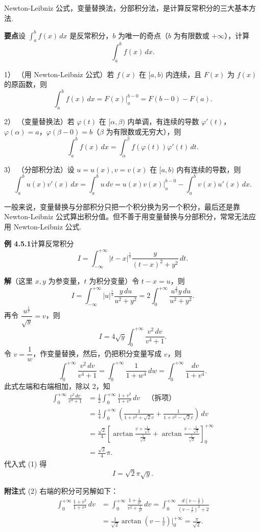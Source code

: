 \documentclass[UTF8,12pt,a4paper,fontset=fandol]{ctexart}
\begin{document}
Newton-Leibniz 公式，变量替换法，分部积分法，是计算反常积分的三大基本方法.

\noindent\textbf{要点}\quad 设 $\displaystyle\int_a^b f(x)\,dx$ 是反常积分，$b$ 为唯一的奇点（$b$ 为有限数或 $+\infty$），计算
\[
\int_a^b f(x)\,dx.
\]

1） （用 Newton-Leibniz 公式）若 $f(x)$ 在 $[a,b)$ 内连续，且 $F(x)$ 为 $f(x)$ 的原函数，则
\[
\int_a^b f(x)\,dx
=F(x)\Big|_a^{b-0}=F(b-0)-F(a).
\]

2） （变量替换法）若 $\varphi(t)$ 在 $[\alpha,\beta)$ 内单调，有连续的导数 $\varphi'(t)$，$\varphi(\alpha)=a$，$\varphi(\beta-0)=b$（$\beta$ 为有限数或无穷大），则
\[
\int_a^b f(x)\,dx
=\int_\alpha^\beta f(\varphi(t))\varphi'(t)\,dt.
\]

3） （分部积分法）设 $u=u(x),v=v(x)$ 在 $[a,b)$ 内有连续的导数，则
\[
\int_a^b u(x)v'(x)\,dx
=\int_a^b u\,dv
=u(x)v(x)\Big|_a^{b-0}-\int_a^b v(x)u'(x)\,dx.
\]

一般来说，变量替换与分部积分只把一个积分换为另一个积分，最后还是靠 Newton-Leibniz 公式算出积分值。但不善于用变量替换与分部积分，常常无法应用 Newton-Leibniz 公式.

\noindent\textbf{例 4.5.1}\quad 计算反常积分
\[
I=\int_{-\infty}^{+\infty}|t-x|^{\frac12}
\frac{y}{(t-x)^2+y^2}\,dt.
\]

\noindent\textbf{解}\quad （这里 $x,y$ 为参变量，$t$ 为积分变量）令 $t-x=u$，则
\[
I=\int_{-\infty}^{+\infty}|u|^{\frac12}\frac{y\,du}{u^2+y^2}
=2\int_0^{+\infty}\frac{u^{\frac12}y\,du}{u^2+y^2}.
\]
再令 $\dfrac{u^{\frac12}}{\sqrt y}=v$，则
\[
I=4\sqrt y\int_0^{+\infty}\frac{v^2\,dv}{v^4+1}. \tag{1}
\]
令 $v=\dfrac1w$，作变量替换，然后，仍把积分变量写成 $v$，则
\[
\int_0^{+\infty}\frac{v^2\,dv}{v^4+1}
=\int_0^{+\infty}\frac1{1+w^4}\,dw
=\int_0^{+\infty}\frac{dv}{1+v^4}.
\]
此式左端和右端相加，除以 2，知
\[
\begin{aligned}
\int_0^{+\infty}\frac{v^2\,dv}{v^4+1}
&=\frac12\int_0^{+\infty}\frac{1+v^2}{1+v^4}\,dv \quad\text{（拆项）}\\
&=\frac14\int_0^{+\infty}
\left(\frac1{1+v^2+\sqrt2v}+\frac1{1+v^2-\sqrt2v}\right)\,dv\\
&=\frac{\sqrt2}{4}\left[
\arctan\frac{v+\frac1{\sqrt2}}{\frac1{\sqrt2}}
+\arctan\frac{v-\frac1{\sqrt2}}{\frac1{\sqrt2}}
\right]_0^{+\infty}\\
&=\frac{\sqrt2}{4}\pi.
\end{aligned}
\]
代入式 (1) 得
\[
I=\sqrt2\pi\sqrt y.
\]

\noindent\textbf{附注}\quad 式 (2) 右端的积分可另解如下：
\[
\begin{aligned}
\int_0^{+\infty}\frac{1+v^2}{1+v^4}\,dv
&=\int_0^{+\infty}\frac{1+\frac1{v^2}}{v^2+\frac1{v^2}}\,dv
=\int_0^{+\infty}\frac{d\left(v-\frac1v\right)}
{\left(v-\frac1v\right)^2+2}\\
&=\frac1{\sqrt2}\arctan\left(v-\frac1v\right)\Big|_0^{+\infty}
=\frac{\pi}{\sqrt2}.
\end{aligned}
\]
\end{document}
